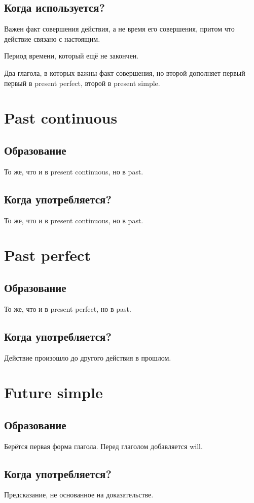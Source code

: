 \documentclass[oneside]{book}
\begin{document}
\subsection{Когда используется?}
Важен факт совершения действия, а не время его совершения, притом что действие связано с настоящим.

Период времени, который ещё не закончен.

Два глагола, в которых важны факт совершения, но второй дополняет первый -
первый в present perfect, второй в present simple.

\section{Past continuous}
\subsection{Образование}
То же, что и в present continuous, но в past.

\subsection{Когда употребляется?}
То же, что и в present continuous, но в past.

\section{Past perfect}
\subsection{Образование}
То же, что и в present perfect, но в past.

\subsection{Когда употребляется?}
Действие произошло до другого действия в прошлом.

\section{Future simple}
\subsection{Образование}
Берётся первая форма глагола. Перед глаголом добавляется will.

\subsection{Когда употребляется?}
Предсказание, не основанное на доказательстве.
\end{document}

